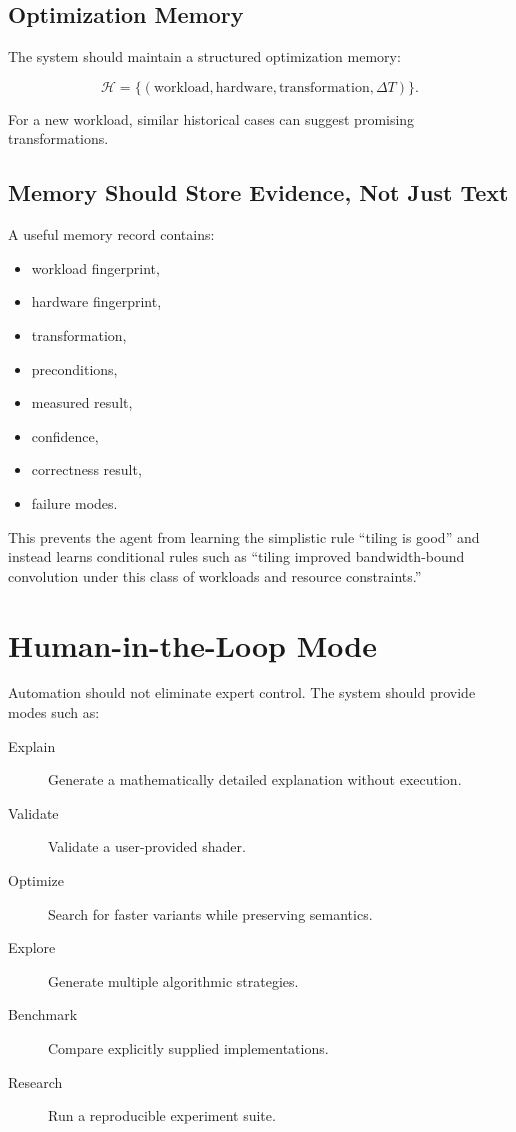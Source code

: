 \documentclass[11pt,a4paper,oneside]{report}
\begin{document}
\section{Optimization Memory}

The system should maintain a structured optimization memory:

\[
\mathcal{H}
=
\{
(\text{workload},\text{hardware},\text{transformation},\Delta T)
\}.
\]

For a new workload, similar historical cases can suggest promising transformations.

\section{Memory Should Store Evidence, Not Just Text}

A useful memory record contains:

\begin{itemize}
  \item workload fingerprint,
  \item hardware fingerprint,
  \item transformation,
  \item preconditions,
  \item measured result,
  \item confidence,
  \item correctness result,
  \item failure modes.
\end{itemize}

This prevents the agent from learning the simplistic rule ``tiling is good'' and instead learns
conditional rules such as ``tiling improved bandwidth-bound convolution under this class of
workloads and resource constraints.''

\chapter{Human-in-the-Loop Mode}

Automation should not eliminate expert control. The system should provide modes such as:

\begin{description}
  \item[Explain] Generate a mathematically detailed explanation without execution.
  \item[Validate] Validate a user-provided shader.
  \item[Optimize] Search for faster variants while preserving semantics.
  \item[Explore] Generate multiple algorithmic strategies.
  \item[Benchmark] Compare explicitly supplied implementations.
  \item[Research] Run a reproducible experiment suite.
\end{description}
\end{document}
